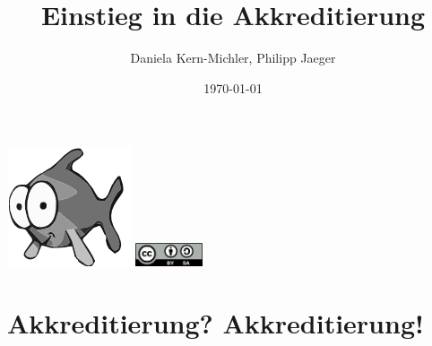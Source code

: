 \documentclass{beamer}
\title{Einstieg in die Akkreditierung}
\author{Daniela Kern-Michler, Philipp Jaeger}
\date{\today}
\begin{document}
\begin{frame}
\maketitle
\vfill
\includegraphics[scale=0.6]{pool.PNG}
\hfill\includegraphics[width=2cm]{CC-BY-SA.png}
\end{frame}


\begin{frame}
\tableofcontents
\end{frame}

\section{Akkreditierung? Akkreditierung!}
\end{document}
